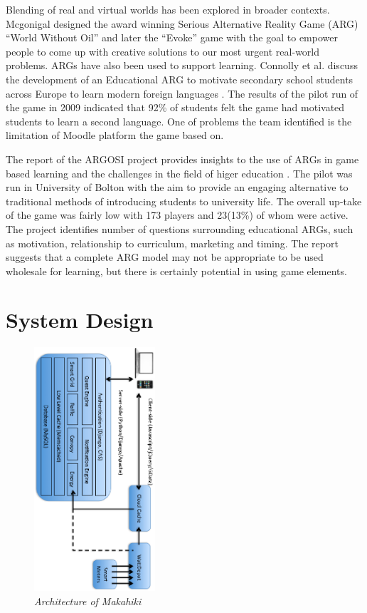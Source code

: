 \documentclass{acm_proc_article-sp}
\begin{document}
Blending of real and virtual worlds has been explored in broader contexts. 
Mcgonigal designed the award winning Serious Alternative Reality Game (ARG) 
``World Without Oil'' \cite{worldwithoutoil} and later the ``Evoke''
 \cite{urgentevoke} game with the goal to empower people to come up with
creative solutions to our most urgent real-world problems. ARGs have also been
used to support learning. Connolly et al. discuss the development of an 
Educational ARG to motivate secondary school students across Europe to learn 
modern foreign languages \cite{connolly2009arguing}. The results of the pilot 
run of the game in 2009 indicated that 92\% of students felt the game had  
motivated students to learn a second language. One of problems
the team identified is the limitation of Moodle platform the game based on.

The report of the ARGOSI project provides insights to the use of ARGs in game
based learning and the challenges in the field of higer education
 \cite{whitton2009alternate}. The pilot was run in University of Bolton with 
the aim to provide an engaging alternative to traditional methods of 
introducing students to university life. The overall up-take of the game was 
fairly low with 173 players and 23(13\%) of whom were active. The project
identifies number of questions surrounding educational ARGs, such as 
motivation, relationship to curriculum, marketing and timing. The report 
suggests that a complete ARG model may not be appropriate to be used wholesale
for learning, but there is certainly potential in using game elements.

\section{System Design}
\begin{figure}[t!]
  \center
  \includegraphics[width=0.4\textwidth, angle=90]{makahiki-architecture.eps}
  \caption{\em \small Architecture of Makahiki}
  \label{fig:MakahikiArchitecture}
\end{figure}
\end{document}
